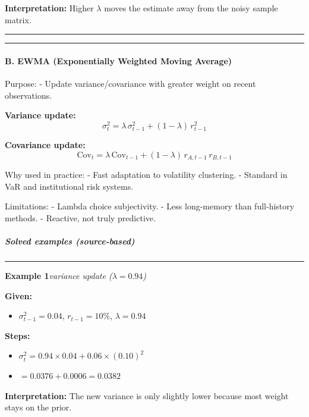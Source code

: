 \documentclass[
]{article}
\begin{document}
\noindent\textbf{Interpretation:} Higher $\lambda$ moves the estimate away from the noisy sample matrix.

\noindent\rule{\linewidth}{0.4pt}
\medskip


\begin{center}\rule{0.5\linewidth}{0.5pt}\end{center}

\hypertarget{b.-ewma-exponentially-weighted-moving-average}{%
\paragraph{B. EWMA (Exponentially Weighted Moving
Average)}\label{b.-ewma-exponentially-weighted-moving-average}}

Purpose: - Update variance/covariance with greater weight on recent
observations.

\textbf{Variance update:}
\[
\sigma_t^2 = \lambda\,\sigma_{t-1}^2 + (1-\lambda)\,r_{t-1}^2
\]

\textbf{Covariance update:}
\[
\text{Cov}_t = \lambda\,\text{Cov}_{t-1} + (1-\lambda)\,r_{A,t-1}\,r_{B,t-1}
\]

Why used in practice: - Fast adaptation to volatility clustering. -
Standard in VaR and institutional risk systems.

Limitations: - Lambda choice subjectivity. - Less long-memory than
full-history methods. - Reactive, not truly predictive.

\hypertarget{solved-examples-source-based-5}{%
\subparagraph{Solved examples
(source-based)}\label{solved-examples-source-based-5}}


\medskip
\noindent\rule{\linewidth}{0.4pt}
\noindent\textbf{Example 1}\enspace\textit{variance update ($\lambda=0.94$)}

\noindent\textbf{Given:}
\begin{itemize}\setlength{\itemsep}{3pt}
  \item $\sigma_{t-1}^2=0.04$, $r_{t-1}=10\%$, $\lambda=0.94$
\end{itemize}
\noindent\textbf{Steps:}
\begin{itemize}\setlength{\itemsep}{3pt}
  \item $\sigma_t^2 = 0.94\times0.04 + 0.06\times(0.10)^2$
  \item $= 0.0376 + 0.0006 = 0.0382$
\end{itemize}

\noindent\textbf{Interpretation:} The new variance is only slightly lower because most weight stays on the prior.
\end{document}

